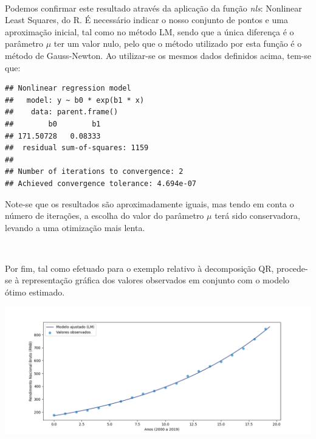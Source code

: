\documentclass[]{article}
\numberwithin{equation}{subsection}
\begin{document}
\(\ \)

Podemos confirmar este resultado através da aplicação da função
\textit{nls}: Nonlinear Least Squares, do R. É necessário indicar o
nosso conjunto de pontos e uma aproximação inicial, tal como no método
LM, sendo que a única diferença é o parâmetro \(\mu\) ter um valor nulo,
pelo que o método utilizado por esta função é o método de Gauss-Newton.
Ao utilizar-se os mesmos dados definidos acima, tem-se que:

\begin{Shaded}
\begin{Highlighting}[]
\SpecialCharTok{\textasciitilde{}}\SpecialCharTok{*}\SpecialCharTok{*} \NormalTok{(} \NormalTok{, } \NormalTok{))}
\end{Highlighting}
\end{Shaded}

\begin{verbatim}
## Nonlinear regression model
##   model: y ~ b0 * exp(b1 * x)
##    data: parent.frame()
##        b0        b1 
## 171.50728   0.08333 
##  residual sum-of-squares: 1159
## 
## Number of iterations to convergence: 2 
## Achieved convergence tolerance: 4.694e-07
\end{verbatim}

Note-se que os resultados são aproximadamente iguais, mas tendo em conta
o número de iterações, a escolha do valor do parâmetro \(\mu\) terá sido
conservadora, levando a uma otimização mais lenta.

\(\ \)

Por fim, tal como efetuado para o exemplo relativo à decomposição QR,
procede-se à representação gráfica dos valores observados em conjunto
com o modelo ótimo estimado.

\includegraphics[width=1\linewidth]{realidadevsLM}
\end{document}

